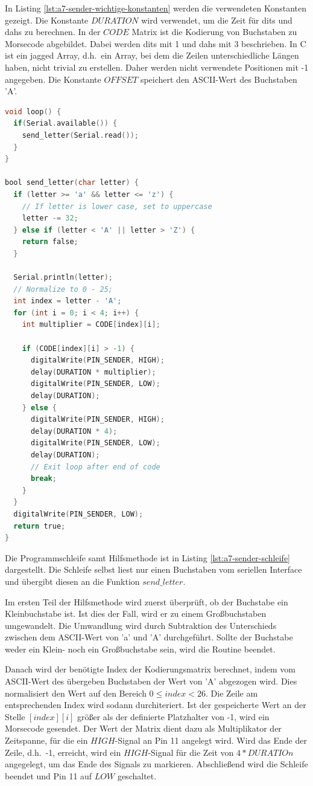 \newpage

In Listing \ref{lst:a7-sender-wichtige-konstanten} werden die verwendeten Konstanten gezeigt.
Die Konstante $DURATION$ wird verwendet, um die Zeit für dits und dahs zu berechnen.
In der $CODE$ Matrix ist die Kodierung von Buchstaben zu Morsecode abgebildet.
Dabei werden dits mit 1 und dahs mit 3 beschrieben.
In C ist ein jagged Array, d.h.\ ein Array, bei dem die Zeilen unterschiedliche Längen haben, nicht trivial zu erstellen.
Daher werden nicht verwendete Positionen mit -1 angegeben.
Die Konstante $OFFSET$ speichert den ASCII-Wert des Buchstaben 'A'.

\begin{lstlisting}[language=C,label={lst:a7-sender-schleife}, caption={Programmschleife des Senders}]
void loop() {
  if(Serial.available()) {
    send_letter(Serial.read());
  }
}

bool send_letter(char letter) {
  if (letter >= 'a' && letter <= 'z') {
    // If letter is lower case, set to uppercase
    letter -= 32;
  } else if (letter < 'A' || letter > 'Z') {
    return false;
  }

  Serial.println(letter);
  // Normalize to 0 - 25;
  int index = letter - 'A';
  for (int i = 0; i < 4; i++) {
    int multiplier = CODE[index][i];

    if (CODE[index][i] > -1) {
      digitalWrite(PIN_SENDER, HIGH);
      delay(DURATION * multiplier);
      digitalWrite(PIN_SENDER, LOW);
      delay(DURATION);
    } else {
      digitalWrite(PIN_SENDER, HIGH);
      delay(DURATION * 4);
      digitalWrite(PIN_SENDER, LOW);
      delay(DURATION);
      // Exit loop after end of code
      break;
    }
  }
  digitalWrite(PIN_SENDER, LOW);
  return true;
}
\end{lstlisting}

Die Programmschleife samt Hilfsmethode ist in Listing \ref{lst:a7-sender-schleife} dargestellt.
Die Schleife selbst liest nur einen Buchstaben vom seriellen Interface und übergibt diesen an die Funktion $send\_letter$.

Im ersten Teil der Hilfsmethode wird zuerst überprüft, ob der Buchstabe ein Kleinbuchstabe ist.
Ist dies der Fall, wird er zu einem Großbuchstaben umgewandelt.
Die Umwandlung wird durch Subtraktion des Unterschieds zwischen dem ASCII-Wert von 'a' und 'A' durchgeführt.
Sollte der Buchstabe weder ein Klein- noch ein Großbuchstabe sein, wird die Routine beendet.

Danach wird der benötigte Index der Kodierungsmatrix berechnet, indem vom ASCII-Wert des übergeben Buchstaben der Wert von 'A' abgezogen wird.
Dies normalisiert den Wert auf den Bereich $0 \leq index < 26$.
Die Zeile am entsprechenden Index wird sodann durchiteriert.
Ist der gespeicherte Wert an der Stelle $[index][i]$ größer als der definierte Platzhalter von -1, wird ein Morsecode gesendet.
Der Wert der Matrix dient dazu als Multiplikator der Zeitspanne, für die ein $HIGH$-Signal an Pin 11 angelegt wird.
Wird das Ende der Zeile, d.h.\ -1, erreicht, wird ein $HIGH$-Signal für die Zeit von $4*DURATIOn$ angegelegt, um das Ende des Signals zu markieren.
Abschließend wird die Schleife beendet und Pin 11 auf $LOW$ geschaltet.

